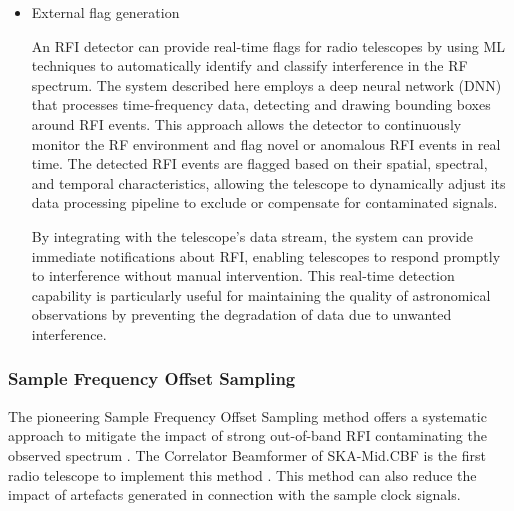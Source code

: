 \begin{itemize}
\item External flag generation

An RFI detector can provide real-time flags for radio telescopes by using ML techniques to automatically identify and classify interference in the RF spectrum. The system described here \citep{9111666} employs a deep neural network (DNN) that processes time-frequency data, detecting and drawing bounding boxes around RFI events. This approach allows the detector to continuously monitor the RF environment and flag novel or anomalous RFI events in real time. The detected RFI events are flagged based on their spatial, spectral, and temporal characteristics, allowing the telescope to dynamically adjust its data processing pipeline to exclude or compensate for contaminated signals.

By integrating with the telescope’s data stream, the system can provide immediate notifications about RFI, enabling telescopes to respond promptly to interference without manual intervention. This real-time detection capability is particularly useful for maintaining the quality of astronomical observations by preventing the degradation of data due to unwanted interference.



\end{itemize}

\subsubsection{Sample Frequency Offset Sampling}

The pioneering Sample Frequency Offset Sampling method offers a systematic approach to mitigate the impact of strong out-of-band RFI contaminating the observed spectrum \citep{carlson_scfo_2017}. The Correlator Beamformer of SKA-Mid.CBF is the first radio telescope to implement this method \citep{ska_mid_cbf_rfi_2019}. This method can also reduce the impact of artefacts generated in connection with the sample clock signals. 

